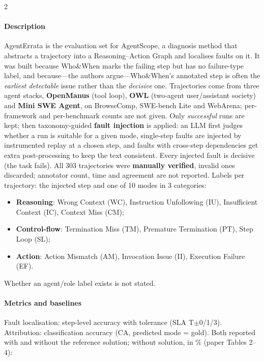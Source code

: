 \begin{multicols}{2}
\paragraph{Description} AgentErrata is the evaluation set for AgentScope, a diagnosis method that abstracts a trajectory into a Reasoning--Action Graph and localises faults on it. It was built because Who\&When marks the failing step but has no failure-type label, and because---the authors argue---Who\&When's annotated step is often the \emph{earliest detectable} issue rather than the \emph{decisive} one. Trajectories come from three agent stacks, \textbf{OpenManus} (tool loop), \textbf{OWL} (two-agent user/assistant society) and \textbf{Mini SWE Agent}, on BrowseComp, SWE-bench Lite and WebArena; per-framework and per-benchmark counts are not given. Only \emph{successful} runs are kept; then taxonomy-guided \textbf{fault injection} is applied: an LLM first judges whether a run is suitable for a given mode, single-step faults are injected by instrumented replay at a chosen step, and faults with cross-step dependencies get extra post-processing to keep the text consistent. Every injected fault is decisive (the task fails). All 303 trajectories were \textbf{manually verified}, invalid ones discarded; annotator count, time and agreement are not reported. Labels per trajectory: the injected step and one of 10 modes in 3 categories:
\begin{itemize}
\item \textbf{Reasoning}: Wrong Context (WC), Instruction Unfollowing (IU), Insufficient Context (IC), Context Miss (CM);
\item \textbf{Control-flow}: Termination Miss (TM), Premature Termination (PT), Step Loop (SL);
\item \textbf{Action}: Action Mismatch (AM), Invocation Issue (II), Execution Failure (EF).
\end{itemize}
Whether an agent/role label exists is not stated.

\paragraph{Metrics and baselines} Fault localisation: step-level accuracy with tolerance (SLA T$\pm$0/1/3). Attribution: classification accuracy (CA, predicted mode = gold). Both reported with and without the reference solution; without solution, in \% (paper Tables 2--4):


\end{multicols}
